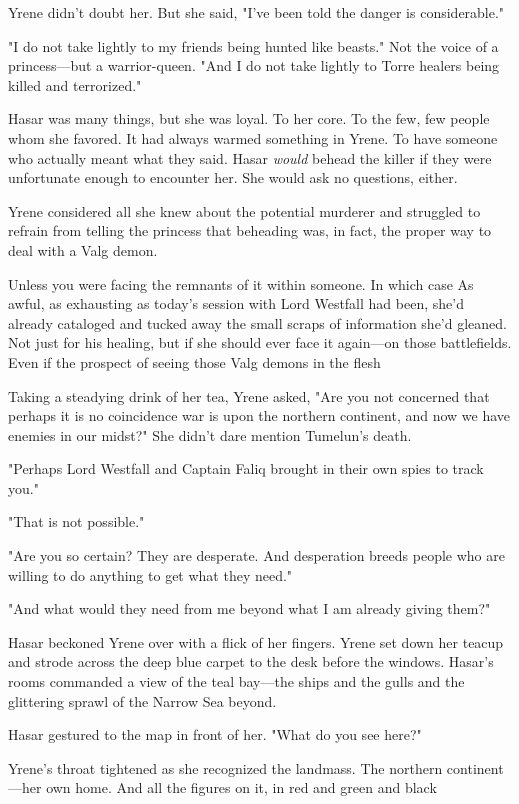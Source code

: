Yrene didn't doubt her.
But she said, "I've been told the danger is  considerable."

"I do not take lightly to my friends being hunted like beasts."
Not the voice of a princess---but a warrior-queen.
"And I do not take lightly to Torre healers being killed and terrorized."

Hasar was many things, but she was loyal.
To her core.
To the few, few people whom she favored.
It had always warmed something in Yrene.
To have someone who actually meant what they said.
Hasar \emph{would}
behead the killer if they were unfortunate enough to encounter her.
She would ask no questions, either.

Yrene considered all she knew about the potential murderer and struggled to refrain from telling the princess that beheading was, in fact, the proper way to deal with a Valg demon.

Unless you were facing the remnants of it within someone.
In which case  As awful, as exhausting as today's session with Lord Westfall had been, she'd already cataloged and tucked away the small scraps of information she'd gleaned.
Not just for his healing, but if she should ever face it again---on those battlefields.
Even if the prospect of seeing those Valg demons in the flesh 

Taking a steadying drink of her tea, Yrene asked, "Are you not concerned that perhaps it is no coincidence war is upon the northern continent, and now we have enemies in our midst?"
She didn't dare mention Tumelun's death.

"Perhaps Lord Westfall and Captain Faliq brought in their own spies to track you."

"That is not possible."

"Are you so certain?
They are desperate.
And desperation breeds people who are willing to do anything to get what they need."

"And what would they need from me beyond what I am already giving them?"

Hasar beckoned Yrene over with a flick of her fingers.
Yrene set down her teacup and strode across the deep blue carpet to the desk before the windows.
Hasar's rooms commanded a view of the teal bay---the ships and the gulls and the glittering sprawl of the Narrow Sea beyond.

Hasar gestured to the map in front of her.
"What do you see here?"

Yrene's throat tightened as she recognized the landmass.
The northern continent---her own home.
And all the figures on it, in red and green and black 

